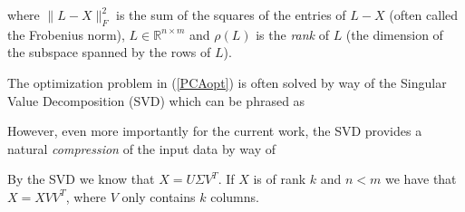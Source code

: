 \documentclass[conference]{IEEEtran}
\begin{document}
\noindent where $\| L-X \|_F^2$ is the sum of the squares of the entries of $L-X$ (often called the Frobenius norm), $L \in \mathbb{R}^{n \times m}$ and $\rho(L)$ is the \emph{rank} of $L$
(the dimension of the subspace spanned by the rows of $L$).

The optimization problem in (\ref{PCAopt}) is often solved by way of the Singular Value
Decomposition (SVD) \cite{Eckart1936} which can be phrased as


However, even more importantly for the current work, the SVD provides a natural \emph{compression} of the input data by way of


By the SVD we know that $X=U \Sigma V^T$.  If $X$ is of rank $k$ and $n<m$ we have that 
$X = X V V^T$, where $V$ only contains $k$ columns.
\end{document}
